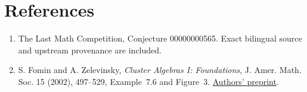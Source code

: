 \documentclass[11pt]{article}
\begin{document}
\section*{References}
\begin{enumerate}
\item The Last Math Competition, Conjecture 00000000565. Exact bilingual
source and upstream provenance are included.
\item S. Fomin and A. Zelevinsky, \emph{Cluster Algebras I: Foundations},
J. Amer. Math. Soc. 15 (2002), 497--529, Example~7.6 and Figure~3.
\href{https://www.esi.ac.at/preprints/esi1023.pdf}{Authors' preprint}.
\end{enumerate}
\end{document}
